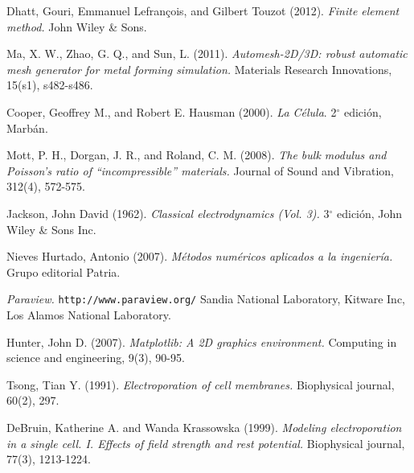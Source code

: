 \begin{thebibliography}{99}
	Dhatt, Gouri, Emmanuel Lefrançois, and Gilbert Touzot (2012). \emph{Finite element method.} John Wiley \& Sons.

	Ma, X. W., Zhao, G. Q., and Sun, L. (2011). \emph{Automesh-2D/3D: robust automatic mesh generator for metal forming simulation.} Materials Research Innovations, 15(s1), s482-s486.

	Cooper, Geoffrey M., and Robert E. Hausman (2000). \emph{La Célula}. 2$^{\circ}$ edición, Marbán.

	Mott, P. H., Dorgan, J. R., and Roland, C. M. (2008). \emph{The bulk modulus and Poisson's ratio of ``incompressible'' materials.} Journal of Sound and Vibration, 312(4), 572-575.
	
	Jackson, John David (1962). \emph{Classical electrodynamics (Vol. 3).} 3$^{\circ}$ edición, John Wiley \& Sons Inc.

	Nieves Hurtado, Antonio (2007). \emph{Métodos numéricos aplicados a la ingeniería.} Grupo editorial Patria.

	\emph{Paraview.}
	\texttt{http://www.paraview.org/}
	Sandia National Laboratory, Kitware Inc, Los Alamos National Laboratory.

	Hunter, John D. (2007). \emph{Matplotlib: A 2D graphics environment.} Computing in science and engineering, 9(3), 90-95.

	Tsong, Tian Y. (1991). \emph{Electroporation of cell membranes.} Biophysical journal, 60(2), 297.

	DeBruin, Katherine A. and Wanda Krassowska (1999). \emph{Modeling electroporation in a single cell. I. Effects of field strength and rest potential.} Biophysical journal, 77(3), 1213-1224.
	

\end{thebibliography}

